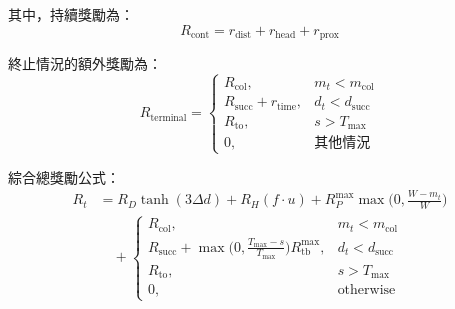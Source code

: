 \documentclass[12pt,a4paper]{article}
\begin{document}
其中，持續獎勵為：
\[
R_{\text{cont}} = r_{\text{dist}} + r_{\text{head}} + r_{\text{prox}}
\]

終止情況的額外獎勵為：
\[
R_{\text{terminal}} =
\begin{cases}
R_{\text{col}}, & m_t < m_{\text{col}} \\
R_{\text{succ}} + r_{\text{time}}, & d_t < d_{\text{succ}} \\
R_{\text{to}}, & s > T_{\max} \\
0, & \text{其他情況}
\end{cases}
\]

綜合總獎勵公式：
\[
\begin{aligned}
R_t &= R_D \tanh(3 \Delta d) + R_H (f \cdot u) + R_P^{\max} \max\!\Big(0,\frac{W-m_t}{W}\Big) \\
&\quad +
\begin{cases}
R_{\text{col}}, & m_t < m_{\text{col}}\\
R_{\text{succ}} + \displaystyle \max\!\Big(0,\frac{T_{\max}-s}{T_{\max}}\Big) R_{\text{tb}}^{\max}, & d_t < d_{\text{succ}}\\
R_{\text{to}}, & s > T_{\max}\\
0, & \text{otherwise}
\end{cases}
\end{aligned}
\]
\end{document}
